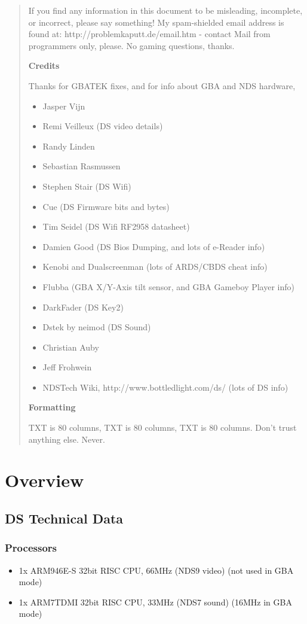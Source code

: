 \documentclass[11pt,a4paper]{proc}
\begin{document}
\begin{flushleft}
\begin{abstract}
If you find any information in this document to be misleading, incomplete, or incorrect, please say something! My spam-shielded email address is found at:
http://problemkaputt.de/email.htm - contact
Mail from programmers only, please. No gaming questions, thanks.

\textbf{Credits}

Thanks for GBATEK fixes, and for info about GBA and NDS hardware,
\begin{itemize}
\item Jasper Vijn
\item Remi Veilleux (DS video details)
\item Randy Linden
\item Sebastian Rasmussen
\item Stephen Stair (DS Wifi)
\item Cue (DS Firmware bits and bytes)
\item Tim Seidel (DS Wifi RF2958 datasheet)
\item Damien Good (DS Bios Dumping, and lots of e-Reader info)
\item Kenobi and Dualscreenman (lots of ARDS/CBDS cheat info)
\item Flubba (GBA X/Y-Axis tilt sensor, and GBA Gameboy Player info)
\item DarkFader (DS Key2)
\item Dstek by neimod (DS Sound)
\item Christian Auby
\item Jeff Frohwein
\item NDSTech Wiki, http://www.bottledlight.com/ds/ (lots of DS info)
\end{itemize}
\textbf{Formatting}

TXT is 80 columns, TXT is 80 columns, TXT is 80 columns.
Don't trust anything else. Never.

\end{abstract}

\section{Overview}

\subsection{DS Technical Data}

\subsubsection{Processors}
\begin{itemize}
\item 1x ARM946E-S 32bit RISC CPU, 66MHz (NDS9 video) (not used in GBA mode)
\item 1x ARM7TDMI  32bit RISC CPU, 33MHz (NDS7 sound) (16MHz in GBA mode)
\end{itemize}


\end{flushleft}
\end{document}
